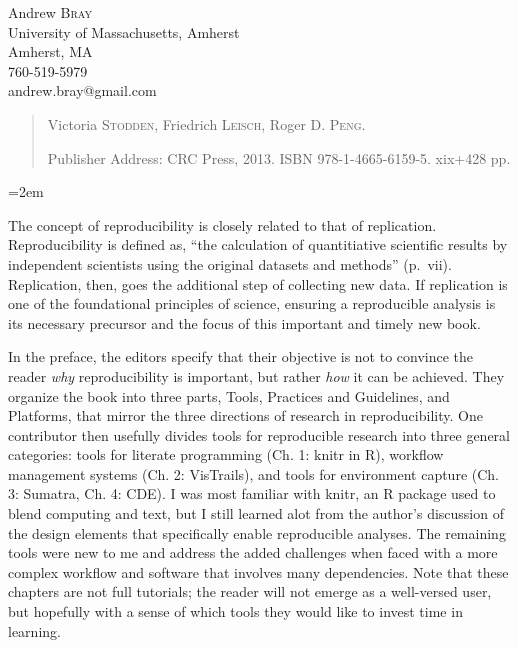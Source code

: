 \documentclass[12pt]{article}
\begin{document}
\noindent
Andrew \textsc{Bray}\\
University of Massachusetts, Amherst \\
Amherst, MA \\
760-519-5979 \\
andrew.bray@gmail.com\\
\medskip

\begin{quote}
Victoria \textsc{Stodden},
Friedrich \textsc{Leisch},
Roger D. \textsc{Peng}.

Publisher Address: CRC Press, 2013. ISBN 978-1-4665-6159-5. 
xix+428 pp. 
\end{quote}

\thispagestyle{empty}
\raggedright\baselineskip=18pt\parindent=2em\parskip=5pt


The concept of reproducibility is closely related to that of replication.
Reproducibility is defined as, ``the calculation of quantitiative scientific results by
independent scientists using the original datasets and methods'' (p.\ vii). Replication,
then, goes the additional step of collecting new data. If replication is one of
the foundational principles of science, ensuring a reproducible analysis is its
necessary precursor and the focus of this important and timely new book.

In the preface, the editors specify that their objective is not to convince the
reader \emph{why} reproducibility is important, but rather \emph{how} it can 
be achieved. They organize the book into three parts, Tools, Practices and 
Guidelines, and Platforms, that mirror the three directions of research in 
reproducibility. One contributor then usefully divides tools for reproducible research into three 
general categories: tools for literate programming (Ch. 1: knitr in R), workflow management 
systems (Ch. 2: VisTrails), and tools for environment capture (Ch. 3: Sumatra, Ch. 4: CDE). 
I was most familiar with knitr, an R package used to blend computing and text,
but I still learned alot from the author's discussion of the design elements that
specifically enable reproducible analyses. The remaining tools were new to me and address
the added challenges when faced with a more complex workflow and software that
involves many dependencies. Note that these chapters are not full
tutorials; the reader will not emerge as a well-versed user, but hopefully with a 
sense of which tools they would like to invest time in learning.
\end{document}
